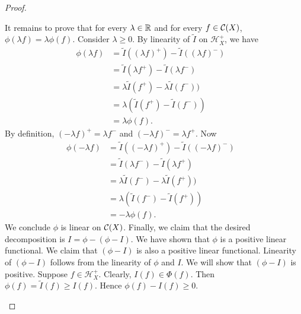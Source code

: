 \begin{proof}
\begin{step}[Generalization to $\C(X)$]
It remains to prove that for every $\lambda \in {\mathbb R}$ and for every $f \in {\mathcal C}(X)$, $\phi(\lambda f) = \lambda \phi (f)$.  Consider $\lambda \geq 0$. By linearity of $\widetilde{I}$ on $\mathcal{H}_{X}^+$, we have
\begin{align*}
    \phi (\lambda f) &= \widetilde{I}((\lambda f)^+) - \widetilde{I}((\lambda f)^-) & \\
                     &= \widetilde{I}(\lambda f^+) - \widetilde{I}(\lambda f^-) & \\
                     &= \lambda \widetilde{I}(f^+) - \lambda \widetilde{I}(f^-)) & \\
                     &= \lambda \left ( \widetilde{I}(f^+) - \widetilde{I}(f^-) \right )  & \\
                     &= \lambda \phi(f).
\end{align*}
By definition, $(-\lambda f)^+ = \lambda f^-$ and $(-\lambda f)^- = \lambda f^+$. Now
\begin{align*}
    \phi (- \lambda f) &= \widetilde{I}((-\lambda f)^+) - \widetilde{I}((-\lambda f)^-) & \\
                     &= \widetilde{I}(\lambda f^-) - \widetilde{I}(\lambda f^+) & \\
                     &= \lambda \widetilde{I}(f^-) - \lambda \widetilde{I}(f^+)) & \\
                     &= \lambda \left ( \widetilde{I}(f^-) - \widetilde{I}(f^+) \right ) & \\ 
                     &= -\lambda \phi(f).
\end{align*}
We conclude $\phi$ is linear on $\C(X)$. Finally, we claim that the desired decomposition is $I = \phi - (\phi - I)$. We have shown that $\phi$ is a positive linear functional. We claim that $(\phi - I)$ is also a positive linear functional. Linearity of $(\phi - I)$ follows from the linearity of $\phi$ and $I$. We will show that   $(\phi - I)$ is positive. Suppose $f \in \mathcal{H}_{X}^+$. Clearly, $I(f) \in \Phi(f)$. Then $\phi(f) = \widetilde{I}(f) \geq I(f)$. Hence $\phi(f) - I(f) \geq 0$.
\end{step}
\end{proof}